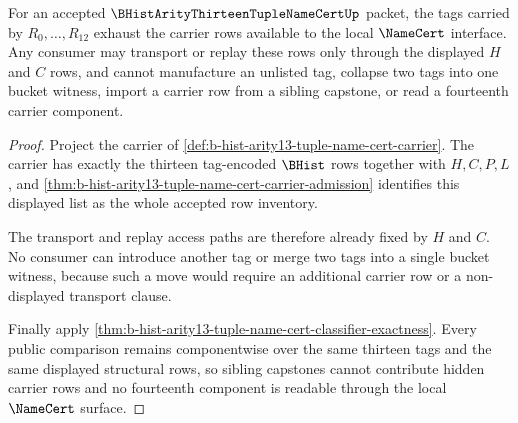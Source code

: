 \begin{theorem}
\label{thm:b-hist-arity13-tuple-name-cert-tag-exhaustion}
For an accepted $\BHistArityThirteenTupleNameCertUp$ packet, the tags carried by $R_0,\ldots,R_{12}$ exhaust the carrier rows available to the local $\NameCert$ interface. Any consumer may transport or replay these rows only through the displayed $H$ and $C$ rows, and cannot manufacture an unlisted tag, collapse two tags into one bucket witness, import a carrier row from a sibling capstone, or read a fourteenth carrier component.
\end{theorem}
\begin{proof}
Project the carrier of \autoref{def:b-hist-arity13-tuple-name-cert-carrier}. The carrier has exactly the thirteen tag-encoded $\BHist$ rows together with $H,C,P,L$, and \autoref{thm:b-hist-arity13-tuple-name-cert-carrier-admission} identifies this displayed list as the whole accepted row inventory.

The transport and replay access paths are therefore already fixed by $H$ and $C$. No consumer can introduce another tag or merge two tags into a single bucket witness, because such a move would require an additional carrier row or a non-displayed transport clause.

Finally apply \autoref{thm:b-hist-arity13-tuple-name-cert-classifier-exactness}. Every public comparison remains componentwise over the same thirteen tags and the same displayed structural rows, so sibling capstones cannot contribute hidden carrier rows and no fourteenth component is readable through the local $\NameCert$ surface.
\end{proof}

